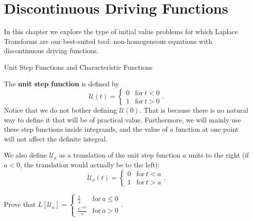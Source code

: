 \chapter{Discontinuous Driving Functions}

\setcounter{example}{1}
\setcounter{exercise}{1}



{\begin{center}
\end{center}



In this chapter we explore the type of initial value problems for which Laplace Transforms are our best-suited tool: non-homogeneous equations with discontinuous driving functions.

\bigskip
\noindent
{\large {\sc Unit Step Functions and Characteristic Functions}}

\bigskip
The 
	{\bf unit step function} is defined by
\[ \mathcal{U}(t) = \left\{ \begin{matrix} 0 & \mbox{for} \ t < 0 \\ 1 & \mbox{for} \ t > 0 \end{matrix} \right. .\]
Notice that we do not bother defining $\mathcal{U}(0)$.  That is because there is no natural way to define it that will be of practical value.  Furthermore, we will mainly use these step functions inside integrands, and the value of a function at one point will not affect the definite integral.

We also define $\mathcal{U}_a$ as a translation of the unit step function $a$ units to the right (if $a<0$, the translation would actually be to the left):
\[ \mathcal{U}_a(t) = \left\{ \begin{matrix} 0 & \mbox{for} \ t < a \\ 1 & \mbox{for} \ t>a \end{matrix} \right. .\]

\begin{exe} Prove that $L[\mathcal{U}_a ] = \left\{ \begin{matrix} \frac{1}{s} & \mbox{for} \ a \leq 0 \\ \frac{e^{-as}}{s} & \mbox{for} \ a > 0 \end{matrix} \right. $.
\end{exe}

}
